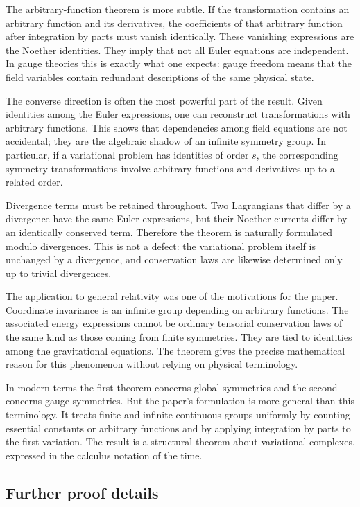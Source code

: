\documentclass[12pt]{article}
\begin{document}
The arbitrary-function theorem is more subtle. If the transformation contains an arbitrary function
and its derivatives, the coefficients of that arbitrary function after integration by parts must
vanish identically. These vanishing expressions are the Noether identities. They imply that not all
Euler equations are independent. In gauge theories this is exactly what one expects: gauge freedom
means that the field variables contain redundant descriptions of the same physical state.

The converse direction is often the most powerful part of the result. Given identities among the
Euler expressions, one can reconstruct transformations with arbitrary functions. This shows that
dependencies among field equations are not accidental; they are the algebraic shadow of an infinite
symmetry group. In particular, if a variational problem has identities of order \(s\), the
corresponding symmetry transformations involve arbitrary functions and derivatives up to a related
order.

Divergence terms must be retained throughout. Two Lagrangians that differ by a divergence have the
same Euler expressions, but their Noether currents differ by an identically conserved term.
Therefore the theorem is naturally formulated modulo divergences. This is not a defect: the
variational problem itself is unchanged by a divergence, and conservation laws are likewise
determined only up to trivial divergences.

The application to general relativity was one of the motivations for the paper. Coordinate
invariance is an infinite group depending on arbitrary functions. The associated energy expressions
cannot be ordinary tensorial conservation laws of the same kind as those coming from finite
symmetries. They are tied to identities among the gravitational equations. The theorem gives the
precise mathematical reason for this phenomenon without relying on physical terminology.

In modern terms the first theorem concerns global symmetries and the second concerns gauge
symmetries. But the paper's formulation is more general than this terminology. It treats finite and
infinite continuous groups uniformly by counting essential constants or arbitrary functions and by
applying integration by parts to the first variation. The result is a structural theorem about
variational complexes, expressed in the calculus notation of the time.


\subsection{Further proof details}
\end{document}
